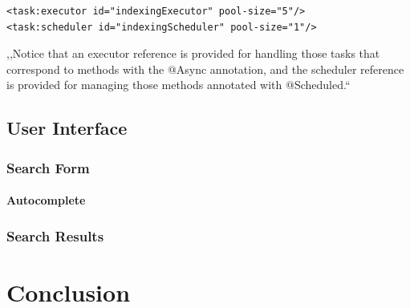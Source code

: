 \documentclass[12pt, oneside, a4paper]{book}
\begin{document}
\begin{lstlisting}
<task:executor id="indexingExecutor" pool-size="5"/> 
<task:scheduler id="indexingScheduler" pool-size="1"/>
\end{lstlisting}




,,Notice that an executor reference is provided for handling those
tasks that correspond to methods with the @Async annotation, and the
scheduler reference is provided for managing those methods annotated
with @Scheduled.``


\section{User Interface}

\subsection{Search Form}

\subsubsection{Autocomplete}

\subsection{Search Results}



\chapter{Conclusion}




\end{document}
